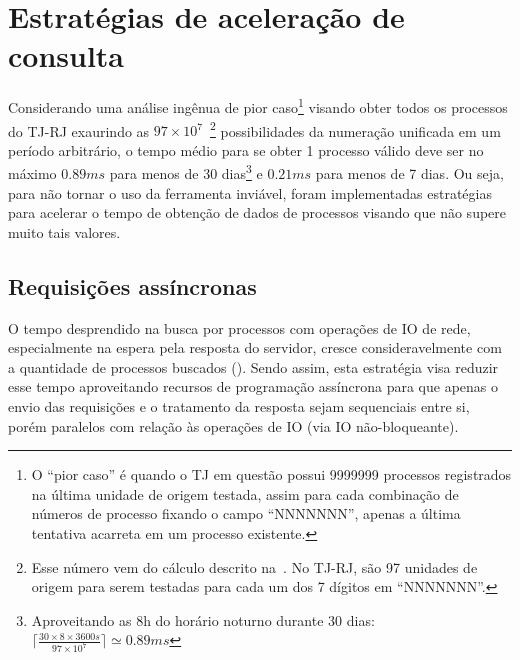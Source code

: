 \section{Estratégias de aceleração de consulta}

Considerando uma análise ingênua de pior caso\footnote{O ``pior caso'' é quando
o TJ em questão possui 9999999 processos registrados na última unidade de
origem testada, assim para cada combinação de números de processo fixando o
campo ``NNNNNNN'', apenas a última tentativa acarreta em um processo
existente.} visando obter todos os processos do TJ-RJ exaurindo as $97
\times 10^{7}$~\footnote{Esse número vem do cálculo descrito
na~. No TJ-RJ, são 97 unidades de origem
para serem testadas para cada um dos 7 dígitos em ``NNNNNNN''.} possibilidades
da numeração unificada em um período arbitrário, o tempo médio para se obter 1
processo válido deve ser no máximo $0.89ms$ para menos de 30
dias\footnote{Aproveitando as 8h do horário noturno durante 30 dias: $\lceil
\frac{30 \times 8 \times 3600s}{97 \times 10^7} \rceil \simeq 0.89ms$} e
$0.21ms$ para menos de 7 dias. Ou seja, para não tornar o uso da ferramenta
inviável, foram implementadas estratégias para acelerar o tempo de obtenção de
dados de processos visando que não supere muito tais valores.

\subsection{Requisições assíncronas~\label{sub:requisições-assíncronas}}

O tempo desprendido na busca por processos com operações de IO de rede,
especialmente na espera pela resposta do servidor, cresce consideravelmente com
a quantidade de processos buscados ().
Sendo assim, esta estratégia visa reduzir esse tempo aproveitando recursos de
programação assíncrona para que apenas o envio das requisições e o tratamento
da resposta sejam sequenciais entre si, porém paralelos com relação às
operações de IO (via IO não-bloqueante).

